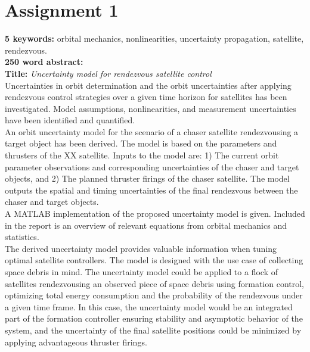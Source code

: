 \section*{Assignment 1}

\textbf{5 keywords:} orbital mechanics, nonlinearities, uncertainty propagation, satellite, rendezvous. \\

\textbf{250 word abstract:} \\
\textbf{Title: } \textit{Uncertainty model for rendezvous satellite control} \\

Uncertainties in orbit determination and the orbit uncertainties after applying rendezvous control strategies over a given time horizon for satellites has been investigated. Model assumptions, nonlinearities, and measurement uncertainties have been identified and quantified. \\

An orbit uncertainty model for the scenario of a chaser satellite rendezvousing a target object has been derived. The model is based on the parameters and thrusters of the XX satellite. Inputs to the model are: 1) The current orbit parameter observations and corresponding uncertainties of the chaser and target objects, and 2) The planned thruster firings of the chaser satellite. The model outputs the spatial and timing uncertainties of the final rendezvous between the chaser and target objects. \\

A MATLAB implementation of the proposed uncertainty model is given. Included in the report is an overview of relevant equations from orbital mechanics and statistics. \\

The derived uncertainty model provides valuable information when tuning optimal satellite controllers. The model is designed with the use case of collecting space debris in mind. The uncertainty model could be applied to a flock of satellites rendezvousing an observed piece of space debris using formation control, optimizing total energy consumption and the probability of the rendezvous under a given time frame. In this case, the uncertainty model would be an integrated part of the formation controller ensuring stability and asymptotic behavior of the system, and the uncertainty of the final satellite positions could be minimized by applying advantageous thruster firings. \\

